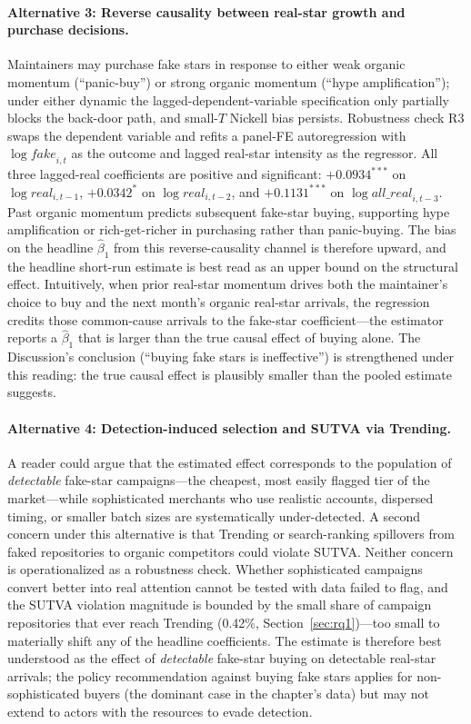 \paragraph{Alternative 3: Reverse causality between real-star growth and purchase decisions.}
Maintainers may purchase fake stars in response to either weak organic momentum (``panic-buy'') or strong organic momentum (``hype amplification''); under either dynamic the lagged-dependent-variable specification only partially blocks the back-door path, and small-$T$ Nickell bias persists.
Robustness check R3 swaps the dependent variable and refits a panel-FE autoregression with $\log \textit{fake}_{i,t}$ as the outcome and lagged real-star intensity as the regressor.
All three lagged-real coefficients are positive and significant: $+0.0934^{***}$ on $\log \textit{real}_{i, t-1}$, $+0.0342^{*}$ on $\log \textit{real}_{i, t-2}$, and $+0.1131^{***}$ on $\log \textit{all\_real}_{i, t-3}$.
Past organic momentum predicts subsequent fake-star buying, supporting hype amplification or rich-get-richer in purchasing rather than panic-buying.
The bias on the headline $\hat\beta_1$ from this reverse-causality channel is therefore upward, and the headline short-run estimate is best read as an upper bound on the structural effect.
Intuitively, when prior real-star momentum drives both the maintainer's choice to buy and the next month's organic real-star arrivals, the regression credits those common-cause arrivals to the fake-star coefficient---the estimator reports a $\hat\beta_1$ that is larger than the true causal effect of buying alone.
The Discussion's conclusion (``buying fake stars is ineffective'') is strengthened under this reading: the true causal effect is plausibly smaller than the pooled estimate suggests.

\paragraph{Alternative 4: Detection-induced selection and SUTVA via Trending.}
A reader could argue that the estimated effect corresponds to the population of \emph{detectable} fake-star campaigns---the cheapest, most easily flagged tier of the market---while sophisticated merchants who use realistic accounts, dispersed timing, or smaller batch sizes are systematically under-detected.
A second concern under this alternative is that Trending or search-ranking spillovers from faked repositories to organic competitors could violate SUTVA.
Neither concern is operationalized as a robustness check.
Whether sophisticated campaigns convert better into real attention cannot be tested with data \SystemName failed to flag, and the SUTVA violation magnitude is bounded by the small share of campaign repositories that ever reach Trending (0.42\%, Section~\ref{sec:rq1})---too small to materially shift any of the headline coefficients.
The estimate is therefore best understood as the effect of \emph{detectable} fake-star buying on detectable real-star arrivals; the policy recommendation against buying fake stars applies for non-sophisticated buyers (the dominant case in the chapter's data) but may not extend to actors with the resources to evade detection.

